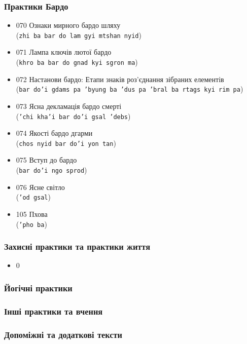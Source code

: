 \documentclass{article}
\begin{document}
\subsubsection{Практики Бардо}

\begingroup\raggedright
\begin{itemize}
\item 070 Ознаки мирного бардо шляху \\ (\texttt{zhi ba bar do lam gyi mtshan nyid})
\item 071 Лампа ключів лютої бардо \\ (\texttt{khro ba bar do gnad kyi sgron ma})
\item 072 Настанови бардо: Етапи знаків роз'єднання зібраних елементів \\ (\texttt{bar do'i gdams pa 'byung ba 'dus pa 'bral ba rtags kyi rim pa})
\item 073 Ясна декламація бардо смерті \\ (\texttt{'chi kha'i bar do'i gsal 'debs})
\item 074 Якості бардо дгарми \\ (\texttt{chos nyid bar do'i yon tan})
\item 075 Вступ до бардо \\ (\texttt{bar do'i ngo sprod})
\item 076 Ясне світло \\ (\texttt{'od gsal})
\item 105 Пхова \\ (\texttt{'pho ba})
\end{itemize}
\endgroup

\subsubsection{Захисні практики та практики життя}

\begingroup\raggedright
\begin{itemize}
\item 0
\end{itemize}
\endgroup

\subsubsection{Йогічні практики}
\subsubsection{Інші практики та вчення}
\subsubsection{Допоміжні та додаткові тексти}
\end{document}
